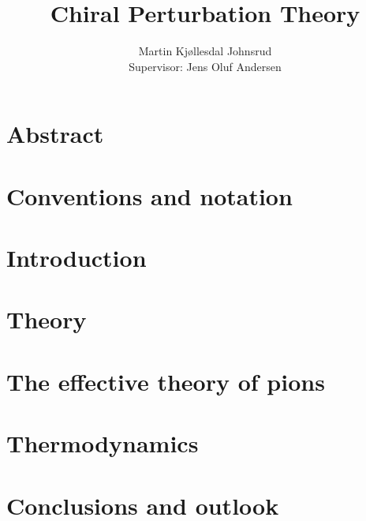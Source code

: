 \documentclass{book}
\title{\Huge{Chiral Perturbation Theory}}
\author{
    \LARGE{Martin Kjøllesdal Johnsrud }\\
    \normalsize{Supervisor: Jens Oluf Andersen}
    }
\begin{document}
\maketitle 

\tableofcontents %
\listoftodos

\chapter*{Abstract}


\chapter*{Conventions and notation}



\chapter{Introduction}



\chapter{Theory}
\label{chapter:theory}






\chapter{The effective theory of pions}
\label{chapter:effective theory of pions}








\chapter{Thermodynamics}
\label{chapter:thermodynamics}






\chapter{Conclusions and outlook}
\label{chpater:conclusion and outlook}
\end{document}
